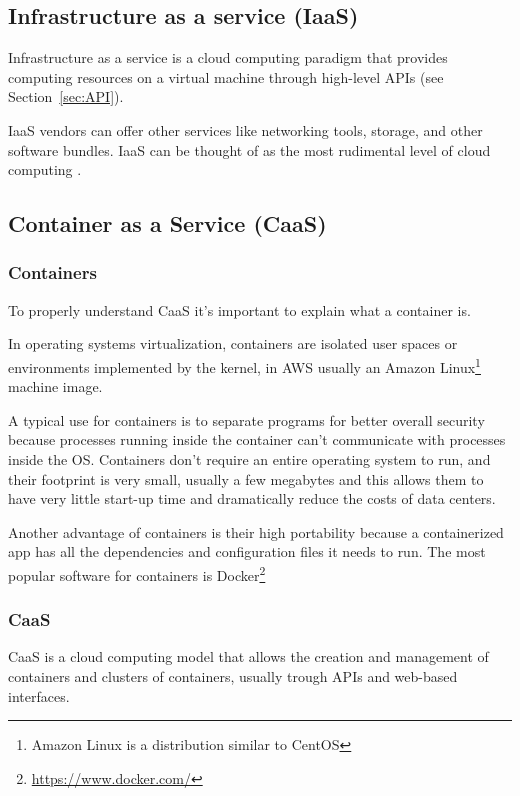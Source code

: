\subsection{Infrastructure as a service (IaaS)}
\label{sub:iaas}
Infrastructure as a service is a cloud computing paradigm that
provides computing resources on a virtual machine through high-level
APIs (see Section~\ref{sec:API}).

IaaS vendors can offer other services like networking tools, storage, and other software bundles.
IaaS can be thought of as the most rudimental level of cloud computing .

\subsection{Container as a Service (CaaS) }
\label{sub:caas}

\subsubsection{Containers}
\label{subsub:containers}
To properly understand CaaS it's important to explain what a container is.

In operating systems virtualization, containers are isolated user
spaces or environments implemented by the kernel, in AWS usually an
Amazon Linux\footnote{Amazon Linux is a distribution similar to
  CentOS} machine image.

A typical use for containers is to separate programs for better overall security because
processes running inside the container can't communicate with processes inside the OS.
Containers don't require an entire operating system to run,
and their footprint is very small, usually a few megabytes and this allows them to have very little
start-up time and dramatically reduce the costs of data centers.

Another advantage of containers is their high 
portability because a containerized app has all the dependencies and configuration files it needs to run.
The most popular software for containers is Docker\footnote{\url{https://www.docker.com/}}


\subsubsection{CaaS}
CaaS is a cloud computing model that allows the creation and management of containers and
clusters of containers,  usually trough APIs and  web-based interfaces\cite{caas}.


